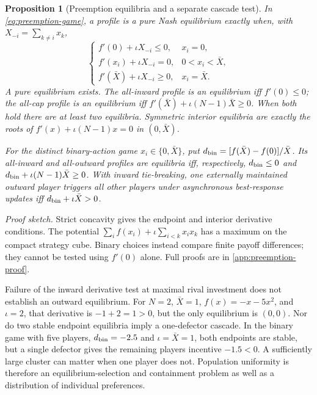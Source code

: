 \documentclass[11pt,a4paper]{article}
\newtheorem{proposition}{Proposition}
\theoremstyle{definition}\newtheorem{definition}{Definition}
\begin{document}
\begin{proposition}[Preemption equilibria and a separate cascade test]
\label{prop:preemption}
In \cref{eq:preemption-game}, a profile is a pure Nash equilibrium exactly
when, with $X_{-i}=\sum_{k\ne i}x_k$,
\begin{equation}
 \begin{cases}
 f'(0)+\iota X_{-i}\leq0,&x_i=0,\\
 f'(x_i)+\iota X_{-i}=0,&0<x_i<\bar X,\\
 f'(\bar X)+\iota X_{-i}\geq0,&x_i=\bar X.
 \end{cases}
 \label{eq:preemption-KKT}
\end{equation}
A pure equilibrium exists. The all-inward profile is an equilibrium iff
$f'(0)\leq0$; the all-cap profile is an equilibrium iff
$f'(\bar X)+\iota(N-1)\bar X\geq0$. When both hold there are at least
two equilibria. Symmetric interior equilibria are exactly the roots of
$f'(x)+\iota(N-1)x=0$ in $(0,\bar X)$.

For the distinct binary-action game $x_i\in\{0,\bar X\}$, put
$d_{\rm bin}=[f(\bar X)-f(0)]/\bar X$. Its all-inward and all-outward
profiles are equilibria iff, respectively,
$d_{\rm bin}\leq0$ and $d_{\rm bin}+\iota(N-1)\bar X\geq0$.
With inward tie-breaking, one externally maintained outward player
triggers all other players under asynchronous best-response updates
iff $d_{\rm bin}+\iota\bar X>0$.
\end{proposition}
\noindent\emph{Proof sketch.}
Strict concavity gives the endpoint and interior derivative conditions.
The potential $\sum_i f(x_i)+\iota\sum_{i<k}x_ix_k$ has a maximum on
the compact strategy cube. Binary choices instead compare finite payoff
differences; they cannot be tested using $f'(0)$ alone. Full proofs are
in \cref{app:preemption-proof}.

Failure of the inward derivative test at maximal rival investment does
not establish an outward equilibrium. For $N=2$, $\bar X=1$,
$f(x)=-x-5x^2$, and $\iota=2$, that derivative is $-1+2=1>0$,
but the only equilibrium is $(0,0)$. Nor do two stable endpoint
equilibria imply a one-defector cascade. In the binary game with five
players, $d_{\rm bin}=-2.5$ and $\iota=\bar X=1$, both endpoints are
stable, but a single defector gives the remaining players incentive
$-1.5<0$. A sufficiently large cluster can matter when one player does
not. Population uniformity is therefore an equilibrium-selection and
containment problem as well as a distribution of individual preferences.
\end{document}
